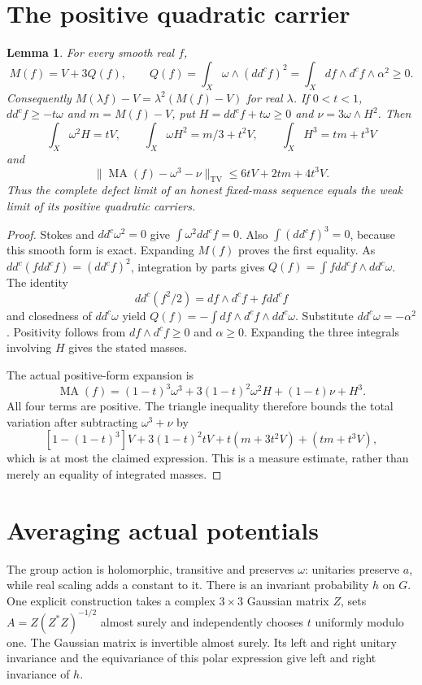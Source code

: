 \documentclass[11pt]{article}
\newtheorem{lemma}{Lemma}
\newcommand{\ddc}{dd^c}
\newcommand{\MA}{\operatorname{MA}}
\newcommand{\TV}{\mathrm{TV}}
\begin{document}
\section{The positive quadratic carrier}
\begin{lemma}\label{lem:carrier}
For every smooth real $f$,
\[
 M(f)=V+3Q(f),\qquad
 Q(f)=\int_X\omega\wedge(\ddc f)^2
     =\int_X df\wedge d^c f\wedge\alpha^2\geq0.
\]
Consequently $M(\lambda f)-V=\lambda^2(M(f)-V)$ for real $\lambda$.
If $0<t<1$, $\ddc f\geq-t\omega$ and $m=M(f)-V$, put
$H=\ddc f+t\omega\geq0$ and $\nu=3\omega\wedge H^2$. Then
\[
 \int_X\omega^2H=tV,\qquad
 \int_X\omega H^2=m/3+t^2V,\qquad
 \int_XH^3=tm+t^3V
\]
and
\[
 \|\MA(f)-\omega^3-\nu\|_{\TV}
       \leq 6tV+2tm+4t^3V.
\]
Thus the complete defect limit of an honest fixed-mass sequence
equals the weak limit of its positive quadratic carriers.
\end{lemma}

\begin{proof}
Stokes and $\ddc\omega^2=0$ give
$\int\omega^2\ddc f=0$. Also
$\int(\ddc f)^3=0$, because this smooth form is exact. Expanding
$M(f)$ proves the first equality. As
$\ddc(f\ddc f)=(\ddc f)^2$, integration by parts gives
$Q(f)=\int f\ddc f\wedge\ddc\omega$. The identity
\[
 \ddc(f^2/2)=df\wedge d^c f+f\ddc f
\]
and closedness of $\ddc\omega$ yield
$Q(f)=-\int df\wedge d^c f\wedge\ddc\omega$.
Substitute $\ddc\omega=-\alpha^2$. Positivity follows from
$df\wedge d^c f\geq0$ and $\alpha\geq0$.
Expanding the three integrals involving $H$ gives the stated masses.

The actual positive-form expansion is
\[
 \MA(f)=(1-t)^3\omega^3+3(1-t)^2\omega^2H
                     +(1-t)\nu+H^3.
\]
All four terms are positive. The triangle inequality therefore bounds
the total variation after subtracting $\omega^3+\nu$ by
\[
 [1-(1-t)^3]V+3(1-t)^2tV+t(m+3t^2V)+(tm+t^3V),
\]
which is at most the claimed expression. This is a measure estimate,
rather than merely an equality of integrated masses.
\end{proof}

\section{Averaging actual potentials}
The group action is holomorphic, transitive and preserves $\omega$:
unitaries preserve $a$, while real scaling adds a constant to it.
There is an invariant probability $h$ on $G$. One explicit construction
takes a complex $3\times3$ Gaussian matrix $Z$, sets
$A=Z(Z^*Z)^{-1/2}$ almost surely and independently chooses $t$
uniformly modulo one. The Gaussian matrix is invertible almost surely.
Its left and right unitary invariance and the equivariance of this
polar expression give left and right invariance of $h$.
\end{document}
